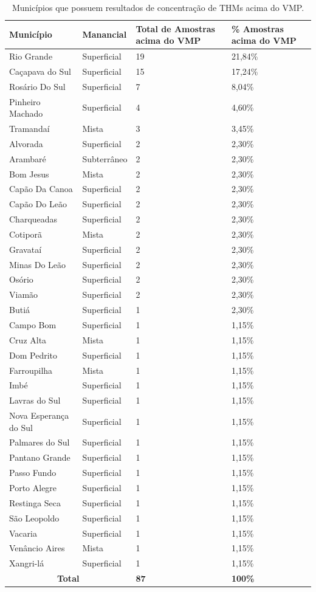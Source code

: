 \begin{table}[!htb]
\centering
\small
\caption{Municípios que possuem resultados de concentração de THMs acima do VMP.}
\label{tab:com_esp}
    \begin{tabular}{p{4cm}p{2cm}p{3cm}p{3cm}}
    \toprule
    \textbf{Município} & \textbf{Manancial} & \textbf{Total de Amostras acima do VMP} & \textbf{\% Amostras acima do VMP}\\ \hline
Rio Grande & Superficial & 19 & 21,84\% \\
Caçapava do Sul & Superficial & 15 & 17,24\%\\
Rosário Do Sul & Superficial & 7 & 8,04\%\\
Pinheiro Machado & Superficial & 4 & 4,60\%\\
Tramandaí & Mista & 3 & 3,45\%\\
Alvorada & Superficial & 2 & 2,30\%\\
Arambaré & Subterrâneo & 2 & 2,30\%\\
Bom Jesus & Mista & 2 & 2,30\% \\
Capão Da Canoa & Superficial & 2 & 2,30\%\\
Capão Do Leão & Superficial & 2 & 2,30\%\\
Charqueadas & Superficial & 2 & 2,30\%\\
Cotiporã & Mista & 2 & 2,30\%\\
Gravataí & Superficial & 2 & 2,30\%\\
Minas Do Leão & Superficial & 2 & 2,30\%\\
Osório & Superficial & 2 & 2,30\%\\
Viamão & Superficial & 2 & 2,30\%\\
Butiá & Superficial & 1 & 2,30\%\\
Campo Bom & Superficial & 1 & 1,15\%\\
Cruz Alta & Mista & 1 & 1,15\%\\
Dom Pedrito & Superficial & 1 & 1,15\%\\
Farroupilha & Mista & 1 & 1,15\%\\
Imbé & Superficial & 1 & 1,15\%\\
Lavras do Sul & Superficial & 1 & 1,15\%\\
Nova Esperança do Sul & Superficial & 1 & 1,15\%\\
Palmares do Sul & Superficial & 1 & 1,15\%\\
Pantano Grande & Superficial & 1 & 1,15\%\\
Passo Fundo & Superficial & 1 & 1,15\%\\
Porto Alegre & Superficial & 1 & 1,15\%\\
Restinga Seca & Superficial & 1 & 1,15\%\\
São Leopoldo & Superficial & 1 & 1,15\%\\
Vacaria & Superficial & 1 & 1,15\%\\
Venâncio Aires & Mista & 1 & 1,15\%\\
Xangri-lá & Superficial & 1 & 1,15\%\\\hline
\multicolumn{2}{c}{\textbf{Total}} & \textbf{87}  & \textbf{100\%}            \\ \bottomrule
    \end{tabular}
    

\end{table}
